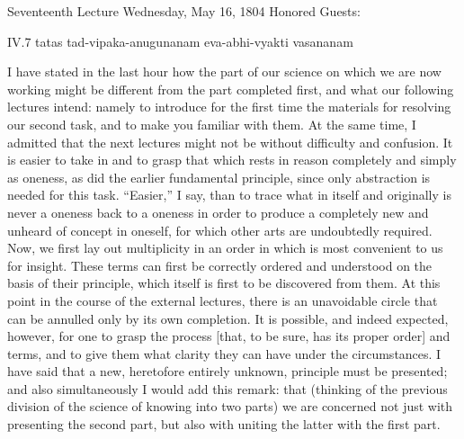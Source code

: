 Seventeenth Lecture
Wednesday, May 16, 1804
Honored Guests:

IV.7
tatas tad-vipaka-anugunanam eva-abhi-vyakti vasananam

I have stated in the last hour how
the part of our science on which we are now working
might be different from the part completed first,
and what our following lectures intend:
namely to introduce for the first time
the materials for resolving our second task,
and to make you familiar with them.
At the same time, I admitted that the next lectures
might not be without difficulty and confusion.
It is easier to take in and to grasp
that which rests in reason
completely and simply as oneness,
as did the earlier fundamental principle,
since only abstraction is needed for this task.
“Easier,” I say, than to trace what
in itself and originally is never a oneness
back to a oneness in order to produce
a completely new and unheard of concept in oneself,
for which other arts are undoubtedly required.
Now, we first lay out multiplicity in an order
in which is most convenient to us for insight.
These terms can first be correctly
ordered and understood on the basis of their principle,
which itself is first to be discovered from them.
At this point in the course of the external lectures,
there is an unavoidable circle that can be annulled
only by its own completion.
It is possible, and indeed expected, however,
for one to grasp the process
[that, to be sure, has its proper order]
and terms, and to give them what clarity
they can have under the circumstances.
I have said that a new, heretofore entirely unknown,
principle must be presented;
and also simultaneously I would add this remark: that
(thinking of the previous division
of the science of knowing into two parts)
we are concerned not just with presenting the second part,
but also with uniting the latter with the first part.

